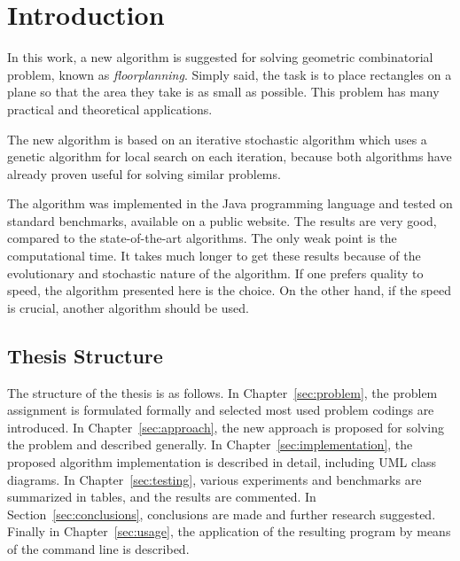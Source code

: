 \chapter{Introduction}

In this work, a new algorithm is suggested for solving geometric combinatorial problem, known as {\em floorplanning}. Simply said, the task is to place rectangles on a plane so that the area they take is as small as possible. This problem has many practical and theoretical applications.

The new algorithm is based on an iterative stochastic algorithm which uses a genetic algorithm for local search on each iteration, because both algorithms have already proven useful for solving similar problems.

The algorithm was implemented in the Java programming language and tested on standard benchmarks, available on a public website. The results are very good, compared to the state-of-the-art algorithms. The only weak point is the computational time. It takes much longer to get these results because of the evolutionary and stochastic nature of the algorithm. If one prefers quality to speed, the algorithm presented here is the choice. On the other hand, if the speed is crucial, another algorithm should be used.

\section{Thesis Structure}

The structure of the thesis is as follows. In Chapter~\ref{sec:problem}, the problem assignment is formulated formally and selected most used problem codings are introduced. In Chapter~\ref{sec:approach}, the new approach is proposed for solving the problem and described generally. In Chapter~\ref{sec:implementation}, the proposed algorithm implementation is described in detail, including UML class diagrams. In Chapter~\ref{sec:testing}, various experiments and benchmarks are summarized in tables, and the results are commented. In Section~\ref{sec:conclusions}, conclusions are made and further research suggested. Finally in Chapter~\ref{sec:usage}, the application of the resulting program by means of the command line is described.
